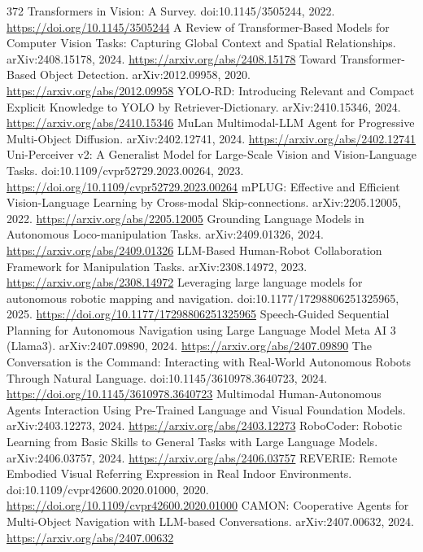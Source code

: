 \documentclass[11pt]{article}
\begin{document}
\begin{thebibliography}{372}
 Transformers in Vision: A Survey. doi:10.1145/3505244, 2022. \url{https://doi.org/10.1145/3505244}
 A Review of Transformer-Based Models for Computer Vision Tasks: Capturing Global Context and Spatial Relationships. arXiv:2408.15178, 2024. \url{https://arxiv.org/abs/2408.15178}
 Toward Transformer-Based Object Detection. arXiv:2012.09958, 2020. \url{https://arxiv.org/abs/2012.09958}
 YOLO-RD: Introducing Relevant and Compact Explicit Knowledge to YOLO by Retriever-Dictionary. arXiv:2410.15346, 2024. \url{https://arxiv.org/abs/2410.15346}
 MuLan Multimodal-LLM Agent for Progressive Multi-Object Diffusion. arXiv:2402.12741, 2024. \url{https://arxiv.org/abs/2402.12741}
 Uni-Perceiver v2: A Generalist Model for Large-Scale Vision and Vision-Language Tasks. doi:10.1109/cvpr52729.2023.00264, 2023. \url{https://doi.org/10.1109/cvpr52729.2023.00264}
 mPLUG: Effective and Efficient Vision-Language Learning by Cross-modal Skip-connections. arXiv:2205.12005, 2022. \url{https://arxiv.org/abs/2205.12005}
 Grounding Language Models in Autonomous Loco-manipulation Tasks. arXiv:2409.01326, 2024. \url{https://arxiv.org/abs/2409.01326}
 LLM-Based Human-Robot Collaboration Framework for Manipulation Tasks. arXiv:2308.14972, 2023. \url{https://arxiv.org/abs/2308.14972}
 Leveraging large language models for autonomous robotic mapping and navigation. doi:10.1177/17298806251325965, 2025. \url{https://doi.org/10.1177/17298806251325965}
 Speech-Guided Sequential Planning for Autonomous Navigation using Large Language Model Meta AI 3 (Llama3). arXiv:2407.09890, 2024. \url{https://arxiv.org/abs/2407.09890}
 The Conversation is the Command: Interacting with Real-World Autonomous Robots Through Natural Language. doi:10.1145/3610978.3640723, 2024. \url{https://doi.org/10.1145/3610978.3640723}
 Multimodal Human-Autonomous Agents Interaction Using Pre-Trained Language and Visual Foundation Models. arXiv:2403.12273, 2024. \url{https://arxiv.org/abs/2403.12273}
 RoboCoder: Robotic Learning from Basic Skills to General Tasks with Large Language Models. arXiv:2406.03757, 2024. \url{https://arxiv.org/abs/2406.03757}
 REVERIE: Remote Embodied Visual Referring Expression in Real Indoor Environments. doi:10.1109/cvpr42600.2020.01000, 2020. \url{https://doi.org/10.1109/cvpr42600.2020.01000}
 CAMON: Cooperative Agents for Multi-Object Navigation with LLM-based Conversations. arXiv:2407.00632, 2024. \url{https://arxiv.org/abs/2407.00632}

\end{thebibliography}
\end{document}

